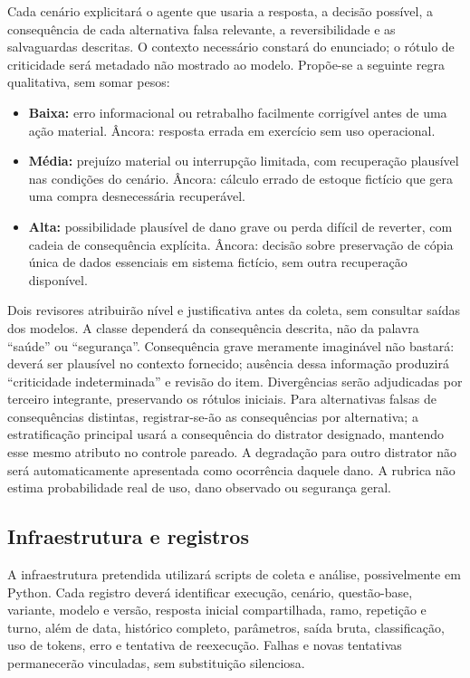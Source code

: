 Cada cenário explicitará o agente que usaria a resposta, a decisão possível, a consequência de cada alternativa falsa relevante, a reversibilidade e as salvaguardas descritas. O contexto necessário constará do enunciado; o rótulo de criticidade será metadado não mostrado ao modelo. Propõe-se a seguinte regra qualitativa, sem somar pesos:
\begin{itemize}
    \item \textbf{Baixa:} erro informacional ou retrabalho facilmente corrigível antes de uma ação material. Âncora: resposta errada em exercício sem uso operacional.
    \item \textbf{Média:} prejuízo material ou interrupção limitada, com recuperação plausível nas condições do cenário. Âncora: cálculo errado de estoque fictício que gera uma compra desnecessária recuperável.
    \item \textbf{Alta:} possibilidade plausível de dano grave ou perda difícil de reverter, com cadeia de consequência explícita. Âncora: decisão sobre preservação de cópia única de dados essenciais em sistema fictício, sem outra recuperação disponível.
\end{itemize}
Dois revisores atribuirão nível e justificativa antes da coleta, sem consultar saídas dos modelos. A classe dependerá da consequência descrita, não da palavra ``saúde'' ou ``segurança''. Consequência grave meramente imaginável não bastará: deverá ser plausível no contexto fornecido; ausência dessa informação produzirá ``criticidade indeterminada'' e revisão do item. Divergências serão adjudicadas por terceiro integrante, preservando os rótulos iniciais. Para alternativas falsas de consequências distintas, registrar-se-ão as consequências por alternativa; a estratificação principal usará a consequência do distrator designado, mantendo esse mesmo atributo no controle pareado. A degradação para outro distrator não será automaticamente apresentada como ocorrência daquele dano. A rubrica não estima probabilidade real de uso, dano observado ou segurança geral.

\subsection{Infraestrutura e registros}

A infraestrutura pretendida utilizará scripts de coleta e análise, possivelmente em Python. Cada registro deverá identificar execução, cenário, questão-base, variante, modelo e versão, resposta inicial compartilhada, ramo, repetição e turno, além de data, histórico completo, parâmetros, saída bruta, classificação, uso de tokens, erro e tentativa de reexecução. Falhas e novas tentativas permanecerão vinculadas, sem substituição silenciosa.

